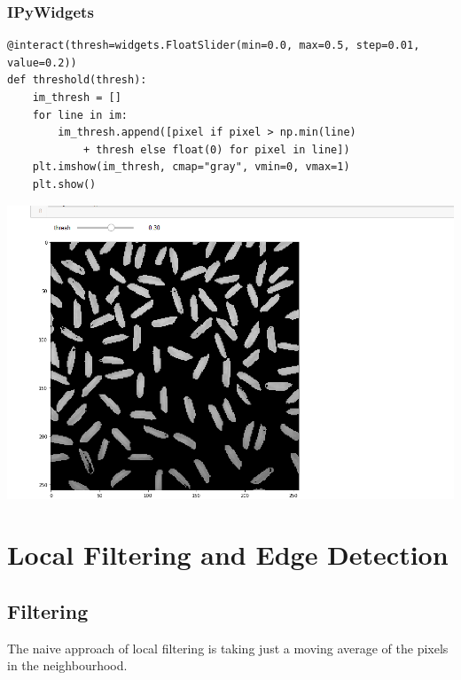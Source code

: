 \documentclass[x11names,11pt,a4paper]{article}
\theoremstyle{definition}
\begin{document}
\subsubsection{IPyWidgets}
\begin{verbatim}
@interact(thresh=widgets.FloatSlider(min=0.0, max=0.5, step=0.01, value=0.2))
def threshold(thresh):
	im_thresh = []
	for line in im:
		im_thresh.append([pixel if pixel > np.min(line) 
			+ thresh else float(0) for pixel in line])
	plt.imshow(im_thresh, cmap="gray", vmin=0, vmax=1)
	plt.show()
\end{verbatim}

\begin{center}
	\includegraphics[width=0.6\linewidth]{img/ipywidgets_example}
\end{center}

\section{Local Filtering and Edge Detection}
\subsection{Filtering}
The naive approach of local filtering is taking just a moving average of the pixels in the neighbourhood.
\end{document}
